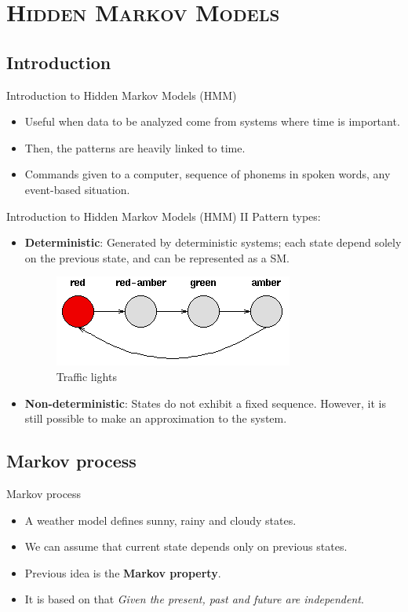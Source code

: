 \documentclass[xcolor=x11names,compress]{beamer}
\renewcommand{\(}{\begin{columns}}
\renewcommand{\)}{\end{columns}}
\newcommand{\<}[1]{\begin{column}{#1}}
\renewcommand{\>}{\end{column}}
\begin{document}
\section{\scshape Hidden Markov Models}
\subsection{Introduction}
\begin{frame}{Introduction to Hidden Markov Models (HMM)}
\begin{itemize}
	\item Useful when data to be analyzed come from systems where time is important.
	\item Then, the patterns are heavily linked to time.
	\item Commands given to a computer, sequence of phonems in spoken words, any event-based situation.
\end{itemize}
\end{frame}

\begin{frame}{Introduction to Hidden Markov Models (HMM) II}
Pattern types:
\begin{itemize}
	\item \textbf{Deterministic}: Generated by deterministic systems; each state depend solely on the previous state, and can be represented as a SM.
	\begin{figure}[]
	\centering
	\includegraphics[scale=0.5]{../report/resources/images/traffic-lights}
	\caption{Traffic lights}
	\label{fig:semaforo}
\end{figure}
	\item \textbf{Non-deterministic}: States do not exhibit a fixed sequence. 
	However, it is still possible to make an approximation to the system.
\end{itemize}
\end{frame}


\subsection{Markov process}
\begin{frame}{Markov process}
\begin{itemize}
\item A weather model defines sunny, rainy and cloudy states.
\item We can assume that current state depends only on previous states.
\item Previous idea is the \textbf{Markov property}.
\item It is based on that \emph{Given the present, past and future are independent}.
\end{itemize}
\end{frame}
\end{document}

